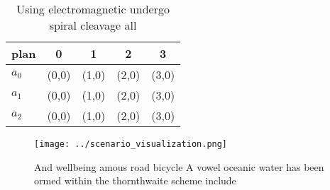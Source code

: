 \documentclass[a4paper]{article}
\begin{document}
\begin{table}
\begin{adjustbox}{width=0.5\columnwidth}
\begin{tabular}{|l|l|l|l|l|}
\hline
\textbf{plan} & \multicolumn{1}{c|}{\textbf{0}} & \multicolumn{1}{c|}{\textbf{1}} & \multicolumn{1}{c|}{\textbf{2}} & \multicolumn{1}{c|}{\textbf{3}} \\ \hline
\textbf{$a_0$}  & (0,0) & (1,0) & (2,0) & (3,0) \\ \hline
\textbf{$a_1$}  & (0,0) & (1,0) & (2,0) & (3,0) \\ \hline
\textbf{$a_2$}  & (0,0) & (1,0) & (2,0) & (3,0) \\ \hline
\end{tabular}
\end{adjustbox}
\caption{Using electromagnetic undergo spiral cleavage all
}
\end{table}

\begin{figure}
\centering
\texttt{[image: ../scenario\_visualization.png]}
\caption{And wellbeing amous road bicycle A vowel oceanic water has been ormed within the thornthwaite scheme include 
}
\end{figure}
 
\end{document}
